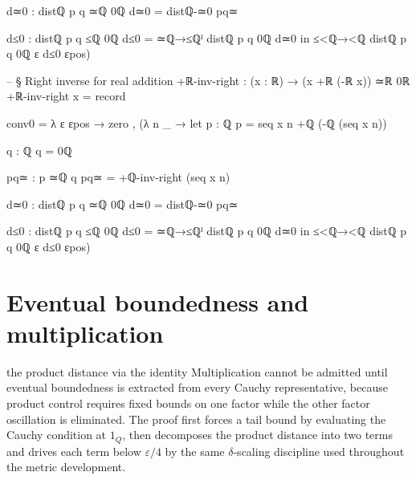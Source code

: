 \documentclass[11pt,a4paper]{book}
\def\mathbb#1{#1}%
\begin{document}
\begin{code}
{          d≃0 : distℚ p q ≃ℚ 0ℚ
          d≃0 = distℚ-≃0 pq≃

          d≤0 : distℚ p q ≤ℚ 0ℚ
          d≤0 = ≃ℚ→≤ℚˡ {distℚ p q} {0ℚ} d≃0
        in
        ≤<ℚ→<ℚ {distℚ p q} {0ℚ} {ε} d≤0 εpos)
  }

-- § Right inverse for real addition
+ℝ-inv-right : (x : ℝ) → (x +ℝ (-ℝ x)) ≃ℝ 0ℝ
+ℝ-inv-right x = record
  { conv0 = λ ε εpos →
      zero , (λ n _ →
        let
          p : ℚ
          p = seq x n +ℚ (-ℚ (seq x n))

          q : ℚ
          q = 0ℚ

          pq≃ : p ≃ℚ q
          pq≃ = +ℚ-inv-right (seq x n)

          d≃0 : distℚ p q ≃ℚ 0ℚ
          d≃0 = distℚ-≃0 pq≃

          d≤0 : distℚ p q ≤ℚ 0ℚ
          d≤0 = ≃ℚ→≤ℚˡ {distℚ p q} {0ℚ} d≃0
        in
        ≤<ℚ→<ℚ {distℚ p q} {0ℚ} {ε} d≤0 εpos)
  }
\end{code}


\section{Eventual boundedness and multiplication}

the product distance via the identity
Multiplication cannot be admitted until eventual boundedness is extracted from every Cauchy representative, because product control requires fixed bounds on one factor while the other factor oscillation is eliminated. The proof first forces a tail bound by evaluating the Cauchy condition at $1_{\mathbb{Q}}$, then decomposes the product distance into two terms and drives each term below $\varepsilon/4$ by the same $\delta$-scaling discipline used throughout the metric development.
\end{document}
